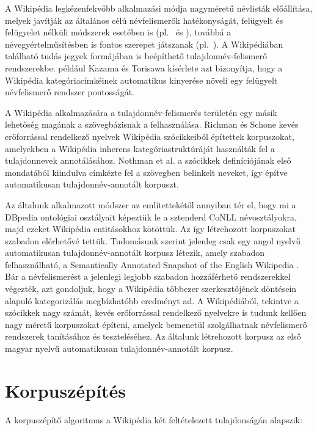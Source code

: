 \documentclass{llncs}
\begin{document}
A Wikipédia legkézenfekvőbb alkalmazási módja nagyméretű névlisták előállítása, melyek javítják az általános célú névfelismerők hatékonyságát, felügyelt és felügyelet nélküli módszerek esetében is (pl.~\cite{Toral:06} és \cite{Nadeau:06}), továbbá a névegyértelműsítésben is fontos szerepet játszanak (pl.~\cite{Bunescu:06}). A Wikipédiában található tudás jegyek formájában is beépíthető tulajdonnév-felismerő rendszerekbe: például Kazama és Torisawa \cite{KaTo07} kísérlete azt bizonyítja, hogy a Wikipédia kategóriacímkéinek automatikus kinyerése növeli egy felügyelt névfelismerő rendszer pontosságát. 

A Wikipédia alkalmazására a tulajdonnév-felismerés területén egy másik lehetőség magának a szövegbázisnak a felhasználása. Richman és Schone \cite{Richman:08} kevés erőforrással rendelkező nyelvek Wikipédia szócikkeiből építettek korpuszokat, amelyekben a Wikipédia inherens kategóriastruktúráját használták fel a tulajdonnevek annotálásához. Nothman et al. \cite{Nothman:08} a szócikkek definíciójának első mondatából kiindulva címkézte fel a szövegben belinkelt neveket, így építve automatikusan tulajdonnév-annotált korpuszt. 

Az általunk alkalmazott módszer az említettekétől annyiban tér el, hogy mi a DBpedia ontológiai osztályait képeztük le a sztenderd CoNLL névosztályokra, majd ezeket Wikipédia entitásokhoz kötöttük. Az így létrehozott korpuszokat szabadon elérhetővé tettük. Tudomásunk szerint jelenleg csak egy angol nyelvű automatikusan tulajdonnév-annotált korpusz létezik, amely szabadon felhasználható, a Semantically Annotated Snapshot of the English Wikipedia \cite{Atserias:08}. Bár a névfelismerést a jelenlegi legjobb szabadon hozzáférhető rendszerekkel végezték, azt gondoljuk, hogy a Wikipédia többezer szerkesztőjének döntésein alapuló kategorizálás megbízhatóbb eredményt ad. A Wikipédiából, tekintve a szócikkek nagy számát, kevés erőforrással rendelkező nyelvekre is tudunk kellően nagy méretű korpuszokat építeni, amelyek bemenetül szolgálhatnak névfelismerő rendszerek tanításához és teszteléséhez. Az általunk létrehozott korpusz az első magyar nyelvű automatikusan tulajdonnév-annotált korpusz. 

\section{Korpuszépítés}
\label{corpusbuilding}

A korpuszépítő algoritmus a Wikipédia két feltételezett tulajdonságán alapszik:
\end{document}
